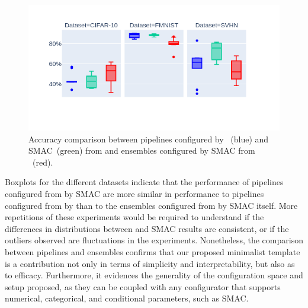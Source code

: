 \begin{figure}
    \centering
    \includegraphics[width=\linewidth, clip=true, trim=45px 80px 80px 40px]{img/smac.png}
    \caption{Accuracy comparison between pipelines configured by \tinyirace~(blue) and SMAC~(green) from \tinyisklearn and ensembles configured by SMAC from \autosklearn~(red).}
    \label{fig:smac}
\end{figure}

Boxplots for the different datasets indicate that the performance of pipelines configured from \isklearn by SMAC are more similar in performance to pipelines configured from \isklearn by \irace than to the ensembles configured from \autosklearn by SMAC itself. 
More repetitions of these experiments would be required to understand if the differences in distributions between \irace and SMAC results are consistent, or if the outliers observed are fluctuations in the experiments. Nonetheless, the comparison between pipelines and ensembles confirms that our proposed minimalist template is a contribution not only in terms of simplicity and interpretability, but also as to efficacy. Furthermore, it evidences the generality of the configuration space and setup proposed, as they can be coupled with any configurator that supports numerical, categorical, and conditional parameters, such as SMAC.


